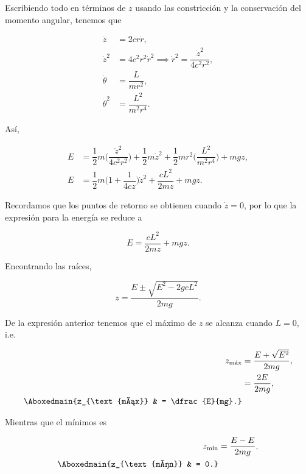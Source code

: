 \documentclass[../main.tex]{subfiles}
\begin{document}
\begin{problema}
	Escribiendo todo en términos de \(z\) usando las constricción y la conservación
	del momento angular, tenemos que

	\begin{align*}
		\dot{z}          & = 2cr \dot{r},                                                                     \\
		\dot{z}^{2}      & = 4c^{2}r^{2} \dot{r}^{2} \implies \dot{r}^{2} = \dfrac{\dot{z}^{2}}{4c^{2}r^{2}}, \\
		\dot{\theta}     & = \dfrac{L}{mr^{2}},                                                               \\
		\dot{\theta}^{2} & = \dfrac{L^{2}}{m^{2}r^{4}}.
	\end{align*}

	Así,

	\begin{align*}
		E & = \dfrac{1}{2}m \Biggl(\dfrac{\dot{z}^{2}}{4c^{2}r^{2}}\Biggr) + \dfrac{1}{2}m \dot{z}^{2}
		+ \dfrac{1}{2}mr^{2} \Biggl(\dfrac{L^{2}}{m^{2}r^{4}}\Biggr) + mgz,                            \\
		E & = \dfrac{1}{2}m \Biggl(1 + \dfrac{1}{4cz}\Biggr)\dot{z}^{2} + \dfrac{cL^{2}}{2mz} + mgz.
	\end{align*}

	Recordamos que los puntos de retorno se obtienen cuando \(\dot{z} = 0\), por lo que
	la expresión para la energía se reduce a

	\begin{equation*}
		E = \dfrac{cL^{2}}{2mz} + mgz.
	\end{equation*}

	Encontrando las raíces,

	\begin{equation*}
		z = \dfrac{E \pm \sqrt{E^{2} - 2gcL^{2}}}{2mg}.
	\end{equation*}

	De la expresión anterior tenemos que el máximo de \(z\) se alcanza cuando \(L = 0\), i.e.

	\begin{align*}
		z_{\text{máx}}             & = \dfrac{E + \sqrt{E^{2}}}{2mg}, \\
		                           & = \dfrac{2E}{2mg},               \\
		\Aboxedmain{z_{\text{máx}} & = \dfrac{E}{mg}.}
	\end{align*}

	Mientras que el mínimos es

	\begin{align*}
		z_{\text{mín}}             & = \dfrac{E - E}{2mg}, \\
		\Aboxedmain{z_{\text{mín}} & = 0.}
	\end{align*}
\end{problema}
\end{document}
